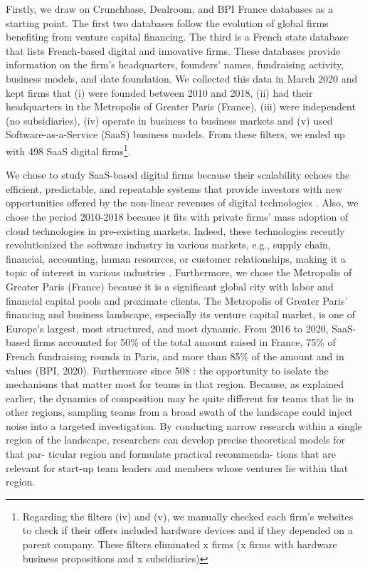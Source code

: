 \documentclass[12pt]{article}
\begin{document}
Firstly, we draw on Crunchbase, Dealroom, and BPI France databases as a starting point. The first two databases follow the evolution of global firms benefiting from venture capital financing. The third is a French state database that lists French-based digital and innovative firms. These databases provide information on the firm's headquarters, founders' names, fundraising activity, business models, and date foundation. We collected this data in March 2020 and kept firms that (i) were founded between 2010 and 2018, (ii) had their headquarters in the Metropolis of Greater Paris (France), (iii) were independent (no subsidiaries), (iv) operate in business to business markets and (v) used Software-as-a-Service (SaaS) business models. From these filters, we ended up with 498 SaaS digital firms\footnote{Regarding the filters (iv) and (v), we manually checked each firm's websites to check if their offers included hardware devices and if they depended on a parent company. These filters eliminated x firms (x firms with hardware business propositions and x subsidiaries)}.

We chose to study SaaS-based digital firms because their scalability echoes the efficient, predictable, and repeatable systems that provide investors with new opportunities offered by the non-linear revenues of digital technologies \citep{nambisan2017digital}. Also, we chose the period 2010-2018 because it fits with private firms' mass adoption of cloud technologies in pre-existing markets. Indeed, these technologies recently revolutionized the software industry in various markets, e.g., supply chain, financial, accounting, human resources, or customer relationships, making it a topic of interest in various industries \citep{luoma2018exploring}. Furthermore, we chose the Metropolis of Greater Paris (France) because it is a significant global city with labor and financial capital pools and proximate clients. The Metropolis of Greater Paris' financing and business landscape, especially its venture capital market, is one of Europe's largest, most structured, and most dynamic. From 2016 to 2020, SaaS-based firms accounted for 50\% of the total amount raised in France, 75\% of French fundraising rounds in Paris, and more than 85\% of the amount and in values (BPI, 2020).
Furthermore since 508 : the opportunity to isolate the mechanisms that matter most for teams in that region. Because, as explained earlier, the dynamics of composition may be quite different for teams that lie in other regions, sampling teams from a broad swath of the landscape could inject noise into a targeted investigation. By conducting narrow research within a single region of the landscape, researchers can develop precise theoretical models for that par- ticular region and formulate practical recommenda- tions that are relevant for start-up team leaders and members whose ventures lie within that region.
\end{document}
